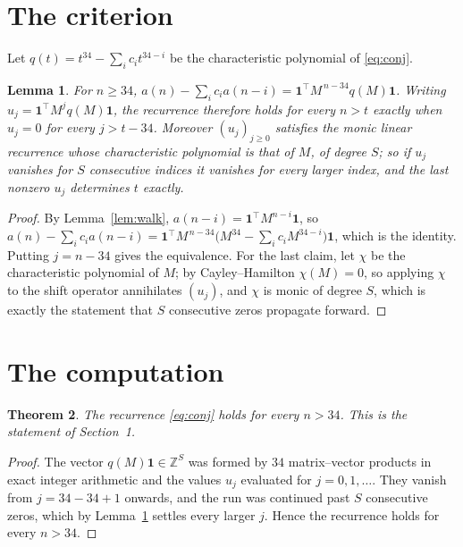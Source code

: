 \documentclass[11pt,a4paper]{article}
\theoremstyle{plain}
\newtheorem{theorem}{Theorem}
\newtheorem{lemma}[theorem]{Lemma}
\theoremstyle{definition}
\begin{document}
\section{The criterion}

Let $q(t)=t^{34}-\sum_i c_i t^{34-i}$ be the characteristic polynomial of
\eqref{eq:conj}.

\begin{lemma}\label{lem:crit}
For $n\ge34$,
$a(n)-\sum_i c_i a(n-i)=\mathbf{1}^{\!\top}M^{\,n-34}q(M)\mathbf{1}$. Writing
$u_j=\mathbf{1}^{\!\top}M^{j}q(M)\mathbf{1}$, the recurrence therefore holds for every
$n>t$ exactly when $u_j=0$ for every $j>t-34$. Moreover $(u_j)_{j\ge0}$ satisfies the
monic linear recurrence whose characteristic polynomial is that of $M$, of degree $S$; so
if $u_j$ vanishes for $S$ consecutive indices it vanishes for every larger index, and the
last nonzero $u_j$ determines $t$ exactly.
\end{lemma}

\begin{proof}
By Lemma~\ref{lem:walk}, $a(n-i)=\mathbf{1}^{\!\top}M^{n-i}\mathbf{1}$, so
$a(n)-\sum_i c_i a(n-i)
=\mathbf{1}^{\!\top}M^{\,n-34}\bigl(M^{34}-\sum_i c_i M^{34-i}\bigr)
\mathbf{1}$, which is the identity. Putting $j=n-34$ gives the equivalence. For the
last claim, let $\chi$ be the characteristic polynomial of $M$; by Cayley--Hamilton
$\chi(M)=0$, so applying $\chi$ to the shift operator annihilates $(u_j)$, and $\chi$ is
monic of degree $S$, which is exactly the statement that $S$ consecutive zeros propagate
forward.
\end{proof}

\section{The computation}

\begin{theorem}
The recurrence \eqref{eq:conj} holds for every $n>34$. This is the statement of
Section~1.
\end{theorem}

\begin{proof}
The vector $q(M)\mathbf{1}\in\mathbb{Z}^{S}$ was formed by $34$ matrix--vector
products in exact integer arithmetic and the values $u_j$ evaluated for
$j=0,1,\dots$. They vanish from $j=34-34+1$ onwards, and the run was continued past
$S$ consecutive zeros, which by Lemma~\ref{lem:crit} settles every larger $j$. Hence the
recurrence holds for every $n>34$.
\end{proof}
\end{document}
